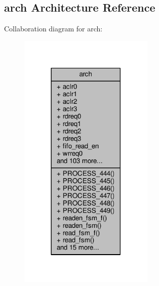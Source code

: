 \subsection{arch Architecture Reference}
\label{classtx__pct__data__mimo__v2_1_1arch}


Collaboration diagram for arch\+:\nopagebreak
\begin{figure}[H]
\begin{center}
\leavevmode
\includegraphics[width=182pt]{d4/d19/classtx__pct__data__mimo__v2_1_1arch__coll__graph}
\end{center}
\end{figure}
